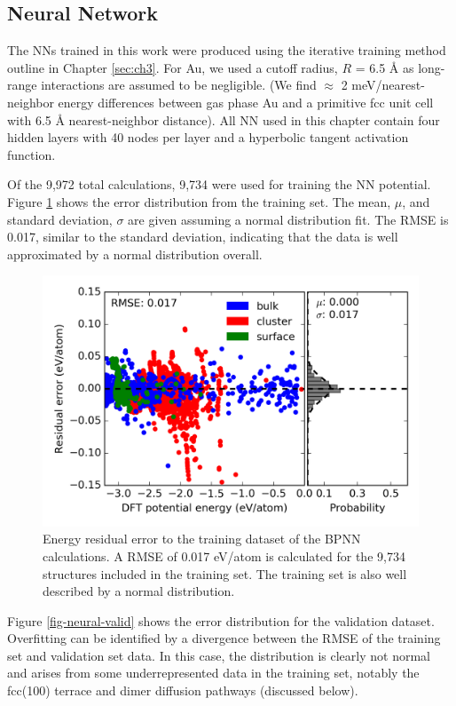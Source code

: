 \documentclass[12pt]{cmuthesis}
\begin{document}
\subsection{Neural Network}
\label{sec:org61a6257}
The NNs trained in this work were produced using the iterative training method outline in Chapter \ref{sec:ch3}. For Au, we used a cutoff radius, \(R\) = 6.5 \AA{} as long-range interactions are assumed to be negligible. (We find \(\approx\) 2 meV/nearest-neighbor energy differences between gas phase Au and a primitive fcc unit cell with 6.5 \AA{} nearest-neighbor distance). All NN used in this chapter contain four hidden layers with 40 nodes per layer and a hyperbolic tangent activation function.

Of the 9,972 total calculations, 9,734 were used for training the NN potential. Figure \ref{fig-neural-train} shows the error distribution from the training set. The mean, \(\mu\), and standard deviation, \(\sigma\) are given assuming a normal distribution fit. The RMSE is 0.017, similar to the standard deviation, indicating that the data is well approximated by a normal distribution overall.

\begin{figure}[h]
\centering
\includegraphics[width=5in]{./images/fig-neural-train.png}
\caption{\label{fig-neural-train}
Energy residual error to the training dataset of the BPNN calculations. A RMSE of 0.017 eV/atom is calculated for the 9,734 structures included in the training set. The training set is also well described by a normal distribution.}
\end{figure}

Figure \ref{fig-neural-valid} shows the error distribution for the validation dataset. Overfitting can be identified by a divergence between the RMSE of the training set and validation set data. In this case, the distribution is clearly not normal and arises from some underrepresented data in the training set, notably the fcc(100) terrace and dimer diffusion pathways (discussed below).
\end{document}
